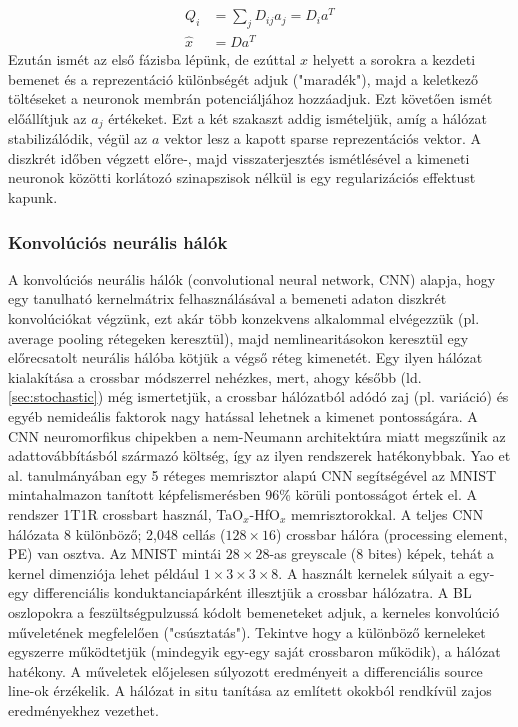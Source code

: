 \documentclass[twoside]{article}
\begin{document}
\begin{align}
	Q_i &= \sum_j D_{ij}a_j = D_i a^T \\
	\hat{x} &= Da^T
\end{align}
Ezután ismét az első fázisba lépünk, de ezúttal $x$ helyett a sorokra a kezdeti bemenet és a reprezentáció különbségét adjuk ("maradék"), majd a keletkező töltéseket a neuronok membrán potenciáljához hozzáadjuk. Ezt követően ismét előállítjuk az $a_j$ értékeket. Ezt a két szakaszt addig ismételjük, amíg a hálózat stabilizálódik, végül az $a$ vektor lesz a kapott sparse reprezentációs vektor. A diszkrét időben végzett előre-, majd visszaterjesztés ismétlésével a kimeneti neuronok közötti korlátozó szinapszisok nélkül is egy regularizációs effektust kapunk.\cite{sheridan2017}
\subsubsection{Konvolúciós neurális hálók}
A konvolúciós neurális hálók (convolutional neural network, CNN) alapja, hogy egy tanulható kernelmátrix felhasználásával a bemeneti adaton diszkrét konvolúciókat végzünk, ezt akár több konzekvens alkalommal elvégezzük (pl. average pooling rétegeken keresztül), majd nemlinearitásokon keresztül egy előrecsatolt neurális hálóba kötjük a végső réteg kimenetét. Egy ilyen hálózat kialakítása a crossbar módszerrel nehézkes, mert, ahogy később (ld. \ref{sec:stochastic}) még ismertetjük, a crossbar hálózatból adódó zaj (pl. variáció) és egyéb nemideális faktorok nagy hatással lehetnek a kimenet pontosságára. A CNN neuromorfikus chipekben a nem-Neumann architektúra miatt megszűnik az adattovábbításból származó költség, így az ilyen rendszerek hatékonybbak. Yao et al. tanulmányában egy 5 réteges memrisztor alapú CNN segítségével az MNIST mintahalmazon tanított képfelismerésben 96\% körüli pontosságot értek el.\cite{yao2020} A rendszer 1T1R crossbart használ, TaO$_x$-HfO$_x$ memrisztorokkal. A teljes CNN hálózata 8 különböző; 2,048 cellás ($128 \times 16$) crossbar hálóra (processing element, PE) van osztva. Az MNIST mintái $28\times 28$-as greyscale (8 bites) képek, tehát a kernel dimenziója lehet például $1\times3\times3\times8$. A használt kernelek súlyait a egy-egy differenciális konduktanciapárként illesztjük a crossbar hálózatra. A BL oszlopokra a feszültségpulzussá kódolt bemeneteket adjuk, a kerneles konvolúció műveletének megfelelően ("csúsztatás"). Tekintve hogy a különböző kerneleket egyszerre működtetjük (mindegyik egy-egy saját crossbaron működik), a hálózat hatékony. A műveletek előjelesen súlyozott eredményeit a differenciális source line-ok érzékelik. A hálózat in situ tanítása az említett okokból rendkívül zajos eredményekhez vezethet.
\end{document}
